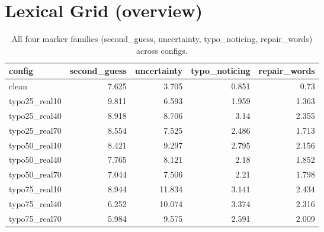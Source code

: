 \documentclass[11pt]{article}
\begin{document}
\section*{Lexical Grid (overview)}
\begin{table}[H]
\centering
\caption{All four marker families (second\_guess, uncertainty, typo\_noticing, repair\_words) across configs.}
\small
\begin{adjustbox}{max width=\textwidth}
\begin{tabular}{lrrrr}
\toprule
\textbf{config} & \textbf{second\_guess} & \textbf{uncertainty} & \textbf{typo\_noticing} & \textbf{repair\_words} \\
\midrule
clean & 7.625 & 3.705 & 0.851 & 0.73 \\
typo25\_real10 & 9.811 & 6.593 & 1.959 & 1.363 \\
typo25\_real40 & 8.918 & 8.706 & 3.14 & 2.355 \\
typo25\_real70 & 8.554 & 7.525 & 2.486 & 1.713 \\
typo50\_real10 & 8.421 & 9.297 & 2.795 & 2.156 \\
typo50\_real40 & 7.765 & 8.121 & 2.18 & 1.852 \\
typo50\_real70 & 7.044 & 7.506 & 2.21 & 1.798 \\
typo75\_real10 & 8.944 & 11.834 & 3.141 & 2.434 \\
typo75\_real40 & 6.252 & 10.074 & 3.374 & 2.316 \\
typo75\_real70 & 5.984 & 9.575 & 2.591 & 2.009 \\
\bottomrule
\end{tabular}
\end{adjustbox}
\end{table}
\end{document}
